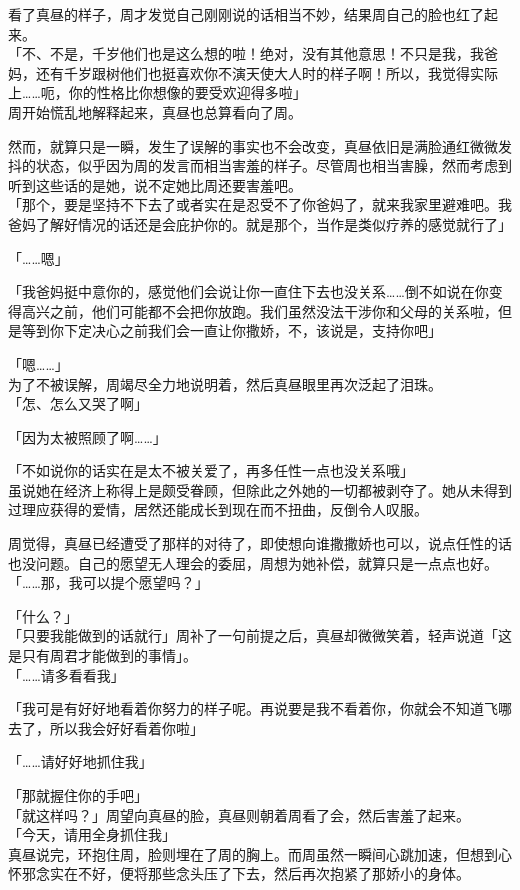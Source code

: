 看了真昼的样子，周才发觉自己刚刚说的话相当不妙，结果周自己的脸也红了起来。\\

「不、不是，千岁他们也是这么想的啦！绝对，没有其他意思！不只是我，我爸妈，还有千岁跟树他们也挺喜欢你不演天使大人时的样子啊！所以，我觉得实际上……呃，你的性格比你想像的要受欢迎得多啦」\\

周开始慌乱地解释起来，真昼也总算看向了周。

然而，就算只是一瞬，发生了误解的事实也不会改变，真昼依旧是满脸通红微微发抖的状态，似乎因为周的发言而相当害羞的样子。尽管周也相当害臊，然而考虑到听到这些话的是她，说不定她比周还要害羞吧。\\

「那个，要是坚持不下去了或者实在是忍受不了你爸妈了，就来我家里避难吧。我爸妈了解好情况的话还是会庇护你的。就是那个，当作是类似疗养的感觉就行了」

「……嗯」

「我爸妈挺中意你的，感觉他们会说让你一直住下去也没关系……倒不如说在你变得高兴之前，他们可能都不会把你放跑。我们虽然没法干涉你和父母的关系啦，但是等到你下定决心之前我们会一直让你撒娇，不，该说是，支持你吧」

「嗯……」\\

为了不被误解，周竭尽全力地说明着，然后真昼眼里再次泛起了泪珠。\\

「怎、怎么又哭了啊」

「因为太被照顾了啊……」

「不如说你的话实在是太不被关爱了，再多任性一点也没关系哦」\\

虽说她在经济上称得上是颇受眷顾，但除此之外她的一切都被剥夺了。她从未得到过理应获得的爱情，居然还能成长到现在而不扭曲，反倒令人叹服。

周觉得，真昼已经遭受了那样的对待了，即使想向谁撒撒娇也可以，说点任性的话也没问题。自己的愿望无人理会的委屈，周想为她补偿，就算只是一点点也好。\\

「……那，我可以提个愿望吗？」

「什么？」\\

「只要我能做到的话就行」周补了一句前提之后，真昼却微微笑着，轻声说道「这是只有周君才能做到的事情」。\\

「……请多看看我」

「我可是有好好地看着你努力的样子呢。再说要是我不看着你，你就会不知道飞哪去了，所以我会好好看着你啦」

「……请好好地抓住我」

「那就握住你的手吧」\\

「就这样吗？」周望向真昼的脸，真昼则朝着周看了会，然后害羞了起来。\\

「今天，请用全身抓住我」\\

真昼说完，环抱住周，脸则埋在了周的胸上。而周虽然一瞬间心跳加速，但想到心怀邪念实在不好，便将那些念头压了下去，然后再次抱紧了那娇小的身体。
